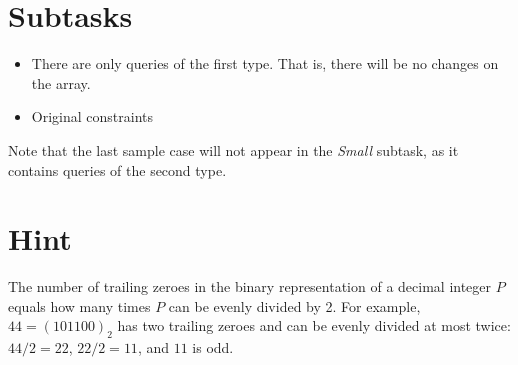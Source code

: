 \section*{Subtasks}
\begin{itemize}
\item There are only queries of the first type. That is, there will be no changes on the array.
\item Original constraints
\end{itemize}

Note that the last sample case will not appear in the {\it Small} subtask, as it contains queries of the second type.

\section*{Hint}
The number of trailing zeroes in the binary representation of a decimal integer $P$ equals how many times $P$ can be evenly divided by 2. For example, $44 = (101100)_2$ has two trailing zeroes and can be evenly divided at most twice: $44 / 2 = 22$, $22 / 2 = 11$, and $11$ is odd.
